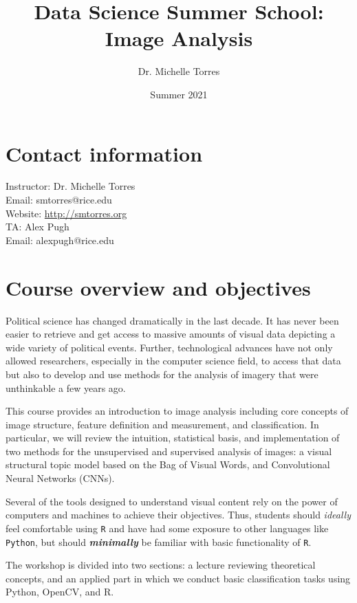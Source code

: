 \documentclass[11pt]{article}
\title{Data Science Summer School: Image Analysis}
\author{Dr. Michelle Torres}
\date{Summer 2021}
\begin{document}
\maketitle

\begin{flushleft}
\section{Contact information}\label{contact-information}

Instructor: Dr. Michelle Torres\\
Email: smtorres@rice.edu\\
Website: \url{http://smtorres.org}\\
TA: Alex Pugh\\
Email: alexpugh@rice.edu\\

\section{Course overview and objectives}\label{course-objectives-and-learning-outcomes}
Political science has changed dramatically in the last decade. It has never been easier to retrieve and get access to massive amounts of visual data depicting a wide variety of political events. Further, technological advances have not only allowed researchers, especially in the computer science field, to access that data but also to develop and use methods for the analysis of imagery that were unthinkable a few years ago. 

This course provides an introduction to image analysis including core concepts of image structure, feature definition and measurement, and classification. In particular, we will review the intuition, statistical basis, and implementation of two methods for the unsupervised and supervised analysis of images: a visual structural topic model based on the Bag of Visual Words, and Convolutional Neural Networks (CNNs). 

Several of the tools designed to understand visual content rely on the power of computers and machines to achieve their objectives. Thus, students should \emph{ideally} feel comfortable using \texttt{R} and have had some exposure to other languages like \texttt{Python}, but should \textbf{\emph{minimally}} be familiar with basic functionality of \texttt{R}.

The workshop is divided into two sections: a lecture reviewing theoretical concepts, and an applied part in which we conduct basic classification tasks using Python, OpenCV, and R.


\end{flushleft}
\end{document}
